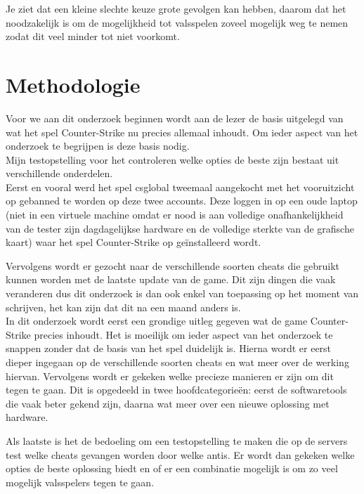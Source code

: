 \documentclass[pdftex,a4paper,12pt,twoside]{report}
\begin{document}
Je ziet dat een kleine slechte keuze grote gevolgen kan hebben, daarom dat het noodzakelijk is om de mogelijkheid tot valsspelen zoveel mogelijk weg te nemen zodat dit veel minder tot niet voorkomt.

\chapter{Methodologie}
\label{ch:methodologie}
Voor we aan dit onderzoek beginnen wordt aan de lezer de basis uitgelegd van wat het spel Counter-Strike nu precies allemaal inhoudt. Om ieder aspect van het onderzoek te begrijpen is deze basis nodig.
\\

Mijn testopstelling voor het controleren welke opties de beste zijn bestaat uit verschillende onderdelen. 
\\

Eerst en vooral werd het spel \gls{csglobal} tweemaal aangekocht met het vooruitzicht op gebanned te worden op deze twee accounts. Deze loggen in op een oude laptop (niet in een virtuele machine omdat er nood is aan volledige onafhankelijkheid van de tester zijn dagdagelijkse hardware en de volledige sterkte van de grafische kaart) waar het spel Counter-Strike op geïnstalleerd wordt. 

Vervolgens wordt er gezocht naar de verschillende soorten \gls{cheat}s die gebruikt kunnen worden met de laatste update van de game. Dit zijn dingen die vaak veranderen dus dit onderzoek is dan ook enkel van toepassing op het moment van schrijven, het kan zijn dat dit na een maand anders is.
\\

In dit onderzoek wordt eerst een grondige uitleg gegeven wat de game Counter-Strike precies inhoudt. Het is moeilijk om ieder aspect van het onderzoek te snappen zonder dat de basis van het spel duidelijk is. Hierna wordt er eerst dieper ingegaan op de verschillende soorten \gls{cheat}s en wat meer over de werking hiervan. Vervolgens wordt er gekeken welke precieze manieren er zijn om dit tegen te gaan. Dit is opgedeeld in twee hoofdcategorieën: eerst de softwaretools die vaak beter gekend zijn, daarna wat meer over een nieuwe oplossing met hardware. 

\newpage
Als laatste is het de bedoeling om een testopstelling te maken die op de servers test welke \gls{cheat}s gevangen worden door welke \gls{anti}s. Er wordt dan gekeken welke opties de beste oplossing biedt en of er een combinatie mogelijk is om zo veel mogelijk valsspelers tegen te gaan. 
\end{document}
